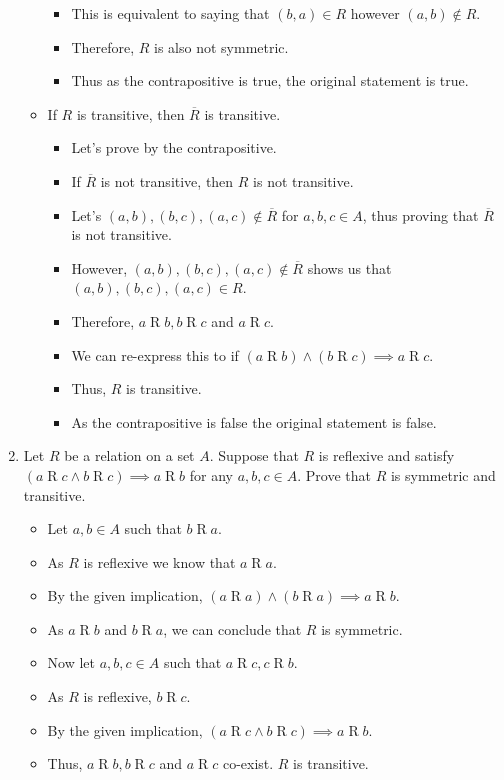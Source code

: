 \documentclass[letterpaper,12pt]{article}
\begin{document}
\begin{enumerate}
\begin{itemize}
\begin{itemize}
\item This is equivalent to saying that $(b,a) \in R $ however $(a,b) \notin R$.
\item Therefore, $R$ is also not symmetric.
\item Thus as the contrapositive is true, the original statement is true.
\end{itemize}
\item If $R$ is transitive, then $\overline R$ is transitive.
\begin{itemize}
\item Let's prove by the contrapositive.
\item If $\overline R$ is not transitive, then $R$ is not transitive.
\item Let's $(a,b),(b,c),(a,c)\notin \overline R$ for $a,b,c \in A$, thus proving that $\overline R$ is not transitive.
\item However, $(a,b),(b,c),(a,c) \notin \overline R$ shows us that $(a,b),(b,c),(a,c) \in R$.
\item Therefore, $a \mathrel R b,b\mathrel R c $ and $a \mathrel R c.$
\item We can re-express this to if $(a \mathrel R b) \wedge (b \mathrel R c) \implies a \mathrel R c$.
\item Thus, $R$ is transitive.
\item As the contrapositive is false the original statement is false.
\end{itemize}
\end{itemize}
\item Let $R$ be a relation on a set $A$. Suppose that $R$ is reflexive and satisfy $(a\mathrel R c \wedge b\mathrel R c) \implies a \mathrel R b $ for any $a,b,c \in A.$ Prove that $R$ is symmetric and transitive.
\begin{itemize}
\item Let $a,b \in A$ such that $b \mathrel R a$.
\item As $R$ is reflexive we know that $a \mathrel R a$.
\item By the given implication, $(a \mathrel R a) \wedge (b \mathrel R a) \implies a \mathrel R b$.
\item As $a \mathrel R b$ and $b \mathrel R a$, we can conclude that $R$ is symmetric.
\item Now let $a,b,c \in A$ such that $a \mathrel R c, c \mathrel R b$.
\item As $R$ is reflexive, $b \mathrel R c$.
\item By the given implication, $(a\mathrel R c \wedge b \mathrel R c) \implies a \mathrel R b.$
\item Thus, $a \mathrel R b ,b \mathrel R c$ and $a \mathrel R c $ co-exist. $R$ is transitive. 
\end{itemize}
 

\end{enumerate}
\end{document}
